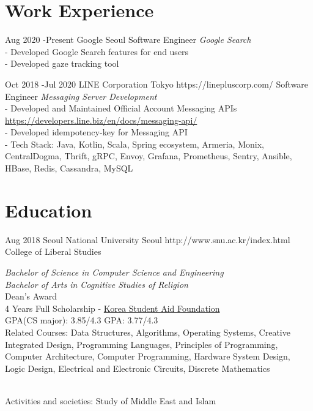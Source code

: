 \documentclass[10pt]{article} %
\begin{document}
\section{Work Experience}

\job
{Aug 2020 -}{Present}
{Google}
{Seoul}
{}
{Software Engineer}
{
\textit{Google Search}\\
- Developed Google Search features for end users\\
- Developed gaze tracking tool
}

\job
{Oct 2018 -}{Jul 2020}
{LINE Corporation}
{Tokyo}
{https://linepluscorp.com/}
{Software Engineer}
{
\textit{Messaging Server Development}\\
- Developed and Maintained Official Account Messaging APIs \href{https://developers.line.biz/en/docs/messaging-api/}{https://developers.line.biz/en/docs/messaging-api/}\\
- Developed idempotency-key for Messaging API\\
- Tech Stack: Java, Kotlin, Scala, Spring ecosystem, Armeria, Monix, CentralDogma, Thrift, gRPC, Envoy, Grafana, Prometheus, Sentry, Ansible, HBase, Redis, Cassandra, MySQL
}



\section{Education}

\job
{Aug 2018}{}
{Seoul National University}
{Seoul}
{http://www.snu.ac.kr/index.html}
{College of Liberal Studies}
{
\textit{Bachelor of Science in Computer Science and Engineering}\\
\if{}
\textit{Bachelor of Arts in Cognitive Studies of Religion}\\
\fi
Dean's Award\\
4 Years Full Scholarship - \href{http://eng.kosaf.go.kr/jsp/main.jsp}{Korea Student Aid Foundation}\\
\if{}
GPA(CS major): 3.85/4.3\hspace{10mm} GPA: 3.77/4.3\\
Related Courses: Data Structures, Algorithms, Operating Systems, Creative Integrated Design, Programming Languages, Principles of Programming, Computer Architecture, Computer Programming, Hardware System Design, Logic Design, Electrical and Electronic Circuits, Discrete Mathematics

\\
Activities and societies: Study of Middle East and Islam
\fi
}
\end{document}
